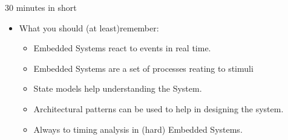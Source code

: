 \documentclass[ngerman={babel}, utf8, bigger, xcolor={table,dvipsnames}, ompress, hyperref={bookmarks,colorlinks}]{beamer}
\begin{document}
\begin{frame}{30 minutes in short}
	\begin{itemize}
		\item What you should (at least)remember:
		\begin{itemize}
			\item Embedded Systems react to events in real time.
			\item Embedded Systems are a set of processes reating to stimuli
			\item State models help understanding the System.
			\item Architectural patterns can be used to help in designing the system.
			\item Always to timing analysis in (hard) Embedded Systems.
		\end{itemize}
	\end{itemize}
\end{frame}
\end{document}
